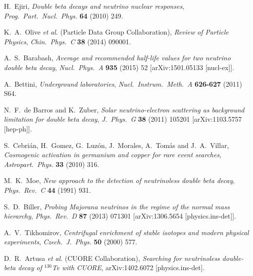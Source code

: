 \documentclass{PoS}
\begin{document}
\begin{thebibliography}{99}
   H.~Ejiri,
   \emph{Double beta decays and neutrino nuclear responses},
   \emph{Prog.\ Part.\ Nucl.\ Phys.} {\bf 64} (2010) 249.

   K.~A.~Olive {\it et al.} (Particle Data Group Collaboration),
   \emph{Review of Particle Physics},
   \emph{Chin.\ Phys.\ C} {\bf 38} (2014) 090001.

   A.~S.~Barabash,
   \emph{Average and recommended half-life values for two neutrino double beta decay},
   \emph{Nucl.\ Phys.\ A} {\bf 935} (2015) 52
   [arXiv:1501.05133 [nucl-ex]].

   A.~Bettini,
   \emph{Underground laboratories},
   \emph{Nucl.\ Instrum.\ Meth.\ A} {\bf 626-627} (2011) S64.

   N.~F.~de Barros and K.~Zuber,
   \emph{Solar neutrino-electron scattering as background limitation for double beta decay},
   \emph{J.\ Phys.\ G} {\bf 38} (2011) 105201
   [arXiv:1103.5757 [hep-ph]].

   S.~Cebri\'an, H.~Gomez, G.~Luz\'on, J.~Morales, A.~Tom\'as and J.~A.~Villar,
   \emph{Cosmogenic activation in germanium and copper for rare event searches},
   \emph{Astropart.\ Phys.} {\bf 33} (2010) 316.

   M.~K.~Moe,
   \emph{New approach to the detection of neutrinoless double beta decay},
   \emph{Phys.\ Rev.\ C} {\bf 44} (1991) 931.

   S.~D.~Biller,
   \emph{Probing Majorana neutrinos in the regime of the normal mass hierarchy},
   \emph{Phys.\ Rev.\ D} {\bf 87} (2013) 071301
   [arXiv:1306.5654 [physics.ins-det]].

   A.~V.~Tikhomirov,
   \emph{Centrifugal enrichment of stable isotopes and modern physical experiments},
   \emph{Czech.\ J.\ Phys.} {\bf 50} (2000) 577.

   D.~R.~Artusa {\it et al.} (CUORE Collaboration),
   \emph{Searching for neutrinoless double-beta decay of $^{130}$Te with CUORE},
   arXiv:1402.6072 [physics.ins-det].


\end{thebibliography}
\end{document}
